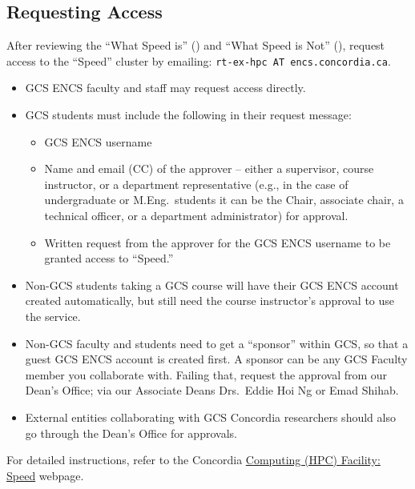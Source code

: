 \subsection{Requesting Access}
\label{sect:access-requests}

After reviewing the ``What Speed is'' () and
``What Speed is Not'' (), request access to the ``Speed''
cluster by emailing: \texttt{rt-ex-hpc AT encs.concordia.ca}.

\begin{itemize}
	\item GCS ENCS faculty and staff may request access directly.
	\item GCS students must include the following in their request message:
	\begin{itemize}
		\item GCS ENCS username
		\item Name and email (CC) of the approver -- either a supervisor, course instructor,
		or a department representative (e.g., in the case of undergraduate or M.Eng.\ students it
		can be the Chair, associate chair, a technical officer, or a department administrator) for approval.
		\item Written request from the approver for the GCS ENCS username to be granted access to ``Speed.''
	\end{itemize}
	\item Non-GCS students taking a GCS course will have their GCS ENCS account created automatically, but still need the course instructor's approval to use the service.
	\item Non-GCS faculty and students need to get a ``sponsor'' within GCS, so that a guest GCS ENCS account is created first. A sponsor can be any GCS Faculty member
	you collaborate with. Failing that, request the approval from our Dean's Office;
	via our Associate Deans Drs.~Eddie Hoi Ng or Emad Shihab.
	\item External entities collaborating with GCS Concordia researchers should also go through the Dean's Office for approvals.
\end{itemize}

For detailed instructions, refer to the Concordia
\href{https://www.concordia.ca/ginacody/aits/speed.html}{Computing (HPC) Facility: Speed} webpage.

